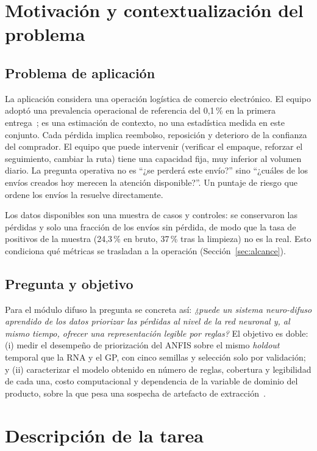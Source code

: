 \documentclass[conference]{IEEEtran}
\begin{document}
\section{Motivación y contextualización del problema}

\subsection{Problema de aplicación}

La aplicación considera una operación logística de comercio electrónico. El
equipo adoptó una prevalencia operacional de referencia del 0,1\,\% en la
primera entrega~\cite{informe_rna}; es una estimación de contexto, no una
estadística medida en este conjunto. Cada pérdida implica reembolso,
reposición y deterioro de la confianza del comprador. El equipo que puede
intervenir (verificar el empaque, reforzar el seguimiento, cambiar la ruta)
tiene una capacidad fija, muy inferior al volumen diario. La pregunta
operativa no es ``¿se perderá este envío?'' sino ``¿cuáles de los envíos
creados hoy merecen la atención disponible?''. Un puntaje de riesgo que
ordene los envíos la resuelve directamente.

Los datos disponibles son una muestra de casos y controles: se conservaron las
pérdidas y solo una fracción de los envíos sin pérdida, de modo que la tasa de
positivos de la muestra (24,3\,\% en bruto, 37\,\% tras la limpieza) no es la
real. Esto condiciona qué métricas se trasladan a la operación
(Sección~\ref{sec:alcance}).

\subsection{Pregunta y objetivo}

Para el módulo difuso la pregunta se concreta así: \emph{¿puede un sistema
neuro-difuso aprendido de los datos priorizar las pérdidas al nivel de la red
neuronal y, al mismo tiempo, ofrecer una representación legible por reglas?}
El objetivo es doble: (i) medir el desempeño de priorización del ANFIS sobre
el mismo \textit{holdout} temporal que la RNA y el GP, con cinco semillas y
selección solo por validación; y (ii) caracterizar el modelo obtenido en
número de reglas, cobertura y legibilidad de cada una, costo computacional y
dependencia de la variable de dominio del producto, sobre la que pesa una
sospecha de artefacto de extracción~\cite{informe_rna,paper_gp}.

\section{Descripción de la tarea}
\end{document}
